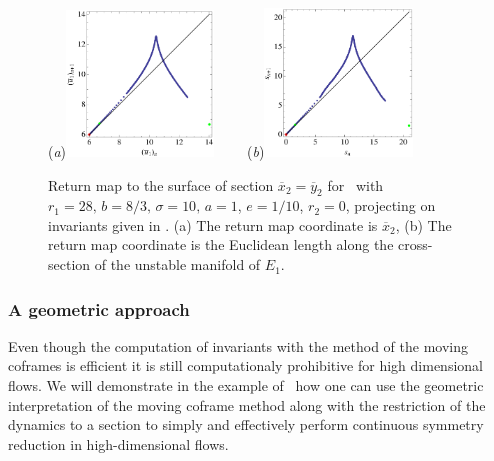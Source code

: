\begin{figure}[ht]
\begin{center}
  (\textit{a})\includegraphics[width=0.35\textwidth]{../figs/CLEinvRMx2.eps}
 ~~~~(\textit{b})\includegraphics[width=0.35\textwidth]{../figs/CLEinvRM.eps}
\end{center}
\caption[\Poincare return map for Complex Lorenz equations]{Return map to the \Poincare
surface of section $\overline{x}_2=\overline{y}_2$ for \CLe\ with $r_1=28,\, b=8/3,\, \sigma=10,\, a=1$, $e=1/10$, $r_2=0$,
projecting on invariants given in . (a) The return map coordinate is
$\overline{x}_2$, (b) The return map coordinate is the Euclidean
length along the \Poincare cross-section of the unstable manifold of $E_1$.
    }
\label{fig:CLEinvRM}
\end{figure}


\subsubsection{A geometric approach}

Even though the computation of invariants with the method of the moving coframes is efficient
it is still computationaly prohibitive for high dimensional flows. We will demonstrate
in the example of \CLe\ how one can use the geometric interpretation of the moving coframe method
along with the restriction of the dynamics to a \Poincare section to simply and effectively
perform continuous symmetry reduction in high-dimensional flows.

